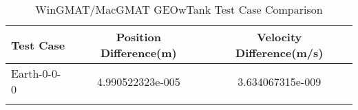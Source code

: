\begin{table}[htbp!]
\centering
\caption{ WinGMAT/MacGMAT GEOwTank Test Case Comparison}
      \begin{tabular}{lcc}
      \hline\hline
          Test Case & Position Difference(m) & Velocity Difference(m/s) \\
         \hline
         Earth-0-0-0 & 4.990522323e-005 & 3.634067315e-009 \\
      \hline\hline
      \label{Table: GEOwTank WinGMAT-MacGMAT Table} 
\end{tabular}
\end{table}
